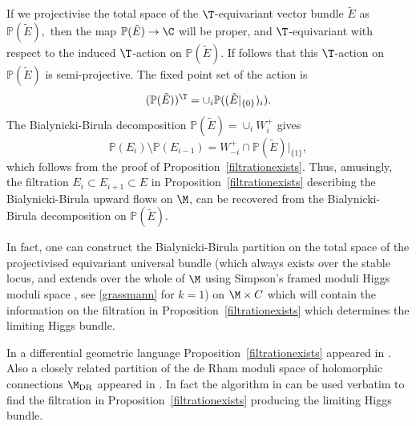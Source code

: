 \begin{remark}
\notready\label{bbonpe} If we projectivise the total space of the $\T$-equivariant vector bundle $\tilde{E}$ as  ${\mathbb P}(\tilde{E}),$ then the map ${\mathbb P}(\tilde{E})\to \C$ will be proper, and $\T$-equivariant with respect to the induced $\T$-action on ${\mathbb P}(\tilde{E})$. If follows that this  $\T$-action on ${\mathbb P}(\tilde{E})$ is semi-projective. The fixed point set of the action is $$({\mathbb P}(\tilde{E}))^\T=\cup_i {\mathbb P}((\tilde{E}|_{\{0\}})_i).$$ The Bialynicki-Birula decomposition ${\mathbb P}(\tilde{E})=\cup_i W^+_i$ gives   $${\mathbb P}(E_i)\setminus {\mathbb P}(E_{i-1}) = W^+_{-i}\cap {\mathbb P}(\tilde{E})|_{\{1\}},$$ which follows from  the  proof of Proposition~\ref{filtrationexists}. Thus, amusingly, the filtration $E_i\subset E_{i+1}\subset E$ in Proposition~\ref{filtrationexists} describing the Bialynicki-Birula upward flows on $\M$, can be recovered from the Bialynicki-Birula decomposition on ${\mathbb P}(\tilde{E})$.

	In fact, one can construct the Bialynicki-Birula partition on the total space of the projectivised equivariant universal bundle (which always exists over the stable locus, and extends over the whole of $\M$ using Simpson's framed moduli Higgs moduli space \cite[Theorem 4.10]{simpson1}, see \eqref{grassmann} for $k=1$) on $\M\times C$ which will contain the information on the filtration in Proposition~\ref{filtrationexists} which determines the limiting  Higgs bundle.
\end{remark}

\begin{remark}
\notready   In a differential geometric language Proposition~\ref{filtrationexists} appeared  in \cite[Proposition 4.2]{collier-wentworth}. Also a closely related partition of the de Rham moduli space of holomorphic connections $\M_{\rm DR}$ appeared in \cite{simpson}. In fact the algorithm in \cite{simpson} can be used verbatim to find the filtration in Proposition~\ref{filtrationexists} producing the limiting Higgs bundle.
\end{remark}


